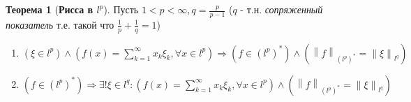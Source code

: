 \documentclass[12pt,a4paper]{article}
\theoremstyle{definition}
\newtheorem{theorem}{Теорема}
\newcommand{\norm}[1]{\left\lVert#1\right\rVert}
\newcommand{\conj}[1]{\left(#1\right)^*}
\begin{document}
\begin{theorem}[\textbf{Рисса в $l^p$}]\label{th:3}
	Пусть $1 < p < \infty, q = \frac{p}{p-1}$ ($q$ - т.н. \textit{сопряженный показатель} т.е. такой что $\frac{1}{p} + \frac{1}{q} = 1$)
	
	\begin{enumerate}
		\item $(\xi \in l^p) \wedge \left(f(x) = \sum\limits_{k=1}^{\infty}{x_k \xi_k}, \forall x \in l^p\right) \Rightarrow
		(f \in \conj{l^p}) \wedge \left(\norm{f}_{\conj{l^p}} = \norm{\xi}_{l^q}\right)$
		\item $(f \in \conj{l^p}) \Rightarrow 
		\exists!\xi\in l^q: (f(x) = \sum\limits_{k=1}^{\infty}{x_k \xi_k}, \forall x \in l^p) \wedge \left(\norm{f}_{\conj{l^p}} = \norm{\xi}_{l^q}\right)$
	\end{enumerate}
\end{theorem}
\end{document}
